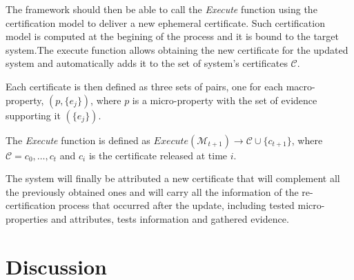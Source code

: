 The framework should then be able to call the \textit{Execute} function using the certification model to deliver a new ephemeral certificate. Such certification model is computed at the begining of the process and it is bound to the target system.The execute function allows obtaining the new certificate for the updated system and automatically adds it to the set of system's certificates \(\mathcal{C}\).

 \begin{defn}
 Each certificate is then defined as three sets of pairs, one for each macro-property, \( (p, \{e_j\}) \), where \(p\) is a micro-property with the set of evidence supporting it \( (\{e_j\}) \).
 \end{defn}
 
\begin{defn}
The \textit{Execute} function is defined as \( Execute(\mathcal{M}_{t+1}) \rightarrow \mathcal{C} \cup \{c_{t+1}\} \), where \( \mathcal{C} = {c_0, \dots , c_t} \) and \(c_i\) is the certificate released at time \(i\).
\end{defn}
 

 
 The system will finally be attributed a new certificate that will complement all the previously obtained ones and will carry all the information of the re-certification process that occurred after the update, including tested micro-properties and attributes, tests information and gathered evidence.



\section{Discussion}

